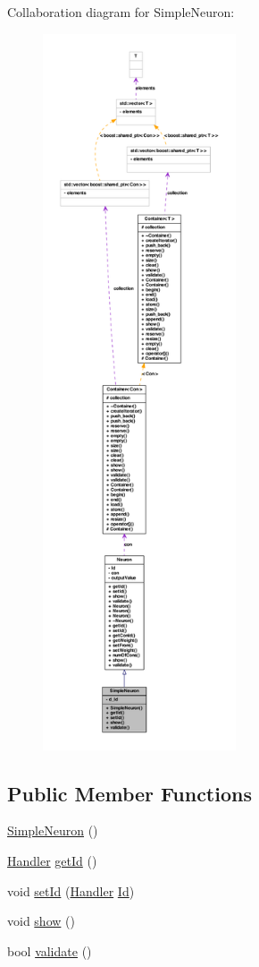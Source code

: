 Collaboration diagram for SimpleNeuron:
\nopagebreak
\begin{figure}[H]
\begin{center}
\leavevmode
\includegraphics[height=600pt]{class_simple_neuron__coll__graph}
\end{center}
\end{figure}
\subsection*{Public Member Functions}
\begin{DoxyCompactItemize}
\item 
\hyperlink{class_simple_neuron_a38c2d75287caf6374c1252c35f73dce2}{SimpleNeuron} ()
\item 
\hyperlink{_a_m_o_r_e_8h_abc871abb71cff6655b8172ee7240b8ef}{Handler} \hyperlink{class_simple_neuron_a2ed8cdd977472afaecca2c6b27c6beef}{getId} ()
\item 
void \hyperlink{class_simple_neuron_a7330de5a6a79925b950f78a65c529297}{setId} (\hyperlink{_a_m_o_r_e_8h_abc871abb71cff6655b8172ee7240b8ef}{Handler} \hyperlink{class_neuron_a72bb327a7c5c865e6748a4e074ce0680}{Id})
\item 
void \hyperlink{class_simple_neuron_afea22112336409283a5bb7d281f7f4bd}{show} ()
\item 
bool \hyperlink{class_simple_neuron_a9e7173abb892281d0b2ffb0efc82f0e5}{validate} ()
\end{DoxyCompactItemize}
